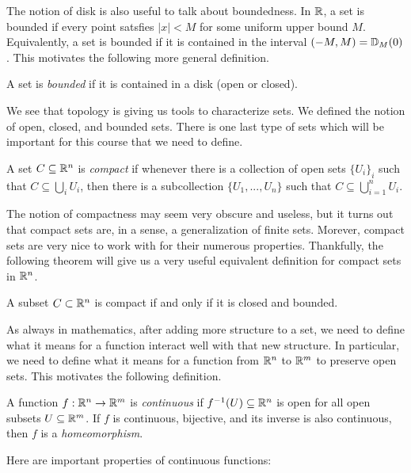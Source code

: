 The notion of disk is also useful to talk about boundedness. In $\mathbb{R}$, a set is bounded if every point satsfies $|x| < M$ for some uniform upper bound $M$. Equivalently, a set is bounded if it is contained in the interval $(-M, M) = \mathbb{D}_M(0)$. This motivates the following more general definition.

\begin{definition}
    A set is \textit{bounded} if it is contained in a disk (open or closed).
\end{definition}

We see that topology is giving us tools to characterize sets. We defined the notion of open, closed, and bounded sets. There is one last type of sets which will be important for this course that we need to define. 

\begin{definition}
    A set $C \subseteq \mathbb{R}^n$ is \textit{compact} if whenever there is a collection of open sets $\{U_i\}_i$ such that $C \subseteq \bigcup_i U_i$, then there is a subcollection $\{U_1, ..., U_n\}$ such that $C \subseteq \bigcup_{i=1}^n U_i$.
\end{definition}

The notion of compactness may seem very obscure and useless, but it turns out that compact sets are, in a sense, a generalization of finite sets. Morever, compact sets are very nice to work with for their numerous properties. Thankfully, the following theorem will give us a very useful equivalent definition for compact sets in $\mathbb{R}^n$. 

\begin{theorem}
    A subset $C \subset \mathbb{R}^n$ is compact if and only if it is closed and bounded.
\end{theorem}

As always in mathematics, after adding more structure to a set, we need to define what it means for a function interact well with that new structure. In particular, we need to define what it means for a function from $\mathbb{R}^n$ to $\mathbb{R}^m$ to preserve open sets. This motivates the following definition.

\begin{definition}
    A function $f : \mathbb{R}^n \to \mathbb{R}^m$ is \textit{continuous} if $f^{-1}(U) \subseteq \mathbb{R}^n$ is open for all open subsets $U \subseteq \mathbb{R}^m$. If $f$ is continuous, bijective, and its inverse is also continuous, then $f$ is a \textit{homeomorphism}.
\end{definition}

Here are important properties of continuous functions:

